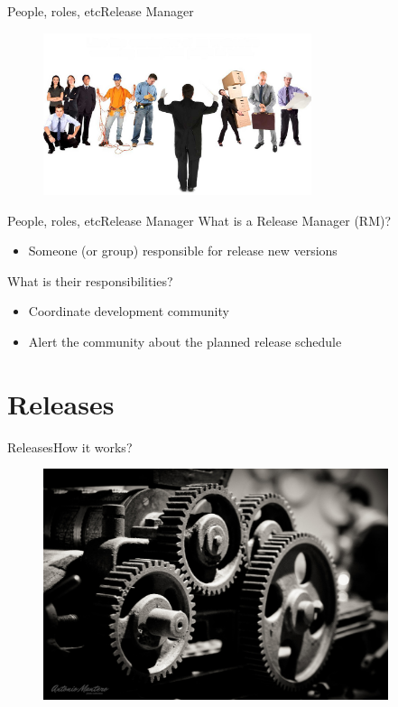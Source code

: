 \documentclass[10pt]{beamer}
\begin{document}
\begin{frame}{People, roles, etc}{Release Manager}
  \begin{figure}[ht]
    \centering
    \includegraphics[width=0.7\textwidth, keepaspectratio=true]{images/release_management.jpg}
  \end{figure}
\end{frame}

\begin{frame}{People, roles, etc}{Release Manager}
  What is a Release Manager (RM)? \pause
  \begin{itemize}
    \item Someone (or group) responsible for release new versions \pause
  \end{itemize}

  What is their responsibilities? \pause
  \begin{itemize}
    \item Coordinate development community \pause
    \item Alert the community about the planned release schedule
  \end{itemize}
\end{frame}

\section{Releases}
\begin{frame}{Releases}{How it works?}
  \begin{figure}[ht]
    \centering
    \includegraphics[width=0.9\textwidth, keepaspectratio=true]{images/gears.jpg}
  \end{figure}
\end{frame}
\end{document}
